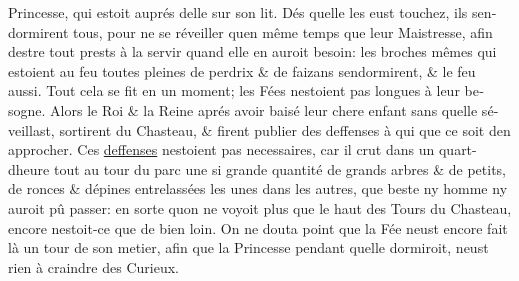 \documentclass[14pt,a4paper]{memoir}
\newcommand{\ul}[1]{\uline{#1}}
\begin{document}
\begin{otherlanguage}{french}
Princesse, qui estoit auprés d\textquotesingle elle sur son lit. Dés
qu\textquotesingle elle les eust touchez, ils
s\textquotesingle endormirent tous, pour ne se réveiller
qu\textquotesingle en même temps que leur Maistresse, afin
d\textquotesingle estre tout prests à la servir quand elle en auroit
besoin: les broches mêmes qui estoient au feu toutes pleines de perdrix
\& de faizans s\textquotesingle endormirent, \& le feu aussi. Tout cela
se fit en un moment; les Fées n\textquotesingle estoient pas longues à
leur besogne. Alors le Roi \& la Reine aprés avoir baisé leur chere
enfant sans qu\textquotesingle elle s\textquotesingle éveillast,
sortirent du Chasteau, \& firent publier des deffenses à qui que ce soit
d\textquotesingle en approcher. Ces \ul{deffenses}
n\textquotesingle estoient pas necessaires, car il crut dans un
quart-d\textquotesingle heure tout au tour du parc une si grande
quantité de grands arbres \& de petits, de ronces \&
d\textquotesingle épines entrelassées les unes dans les autres, que
beste ny homme n\textquotesingle y auroit pû passer: en sorte
qu\textquotesingle on ne voyoit plus que le haut des Tours du Chasteau,
encore n\textquotesingle estoit-ce que de bien loin. On ne douta point
que la Fée n\textquotesingle eust encore fait là un tour de son metier,
afin que la Princesse pendant qu\textquotesingle elle dormiroit,
n\textquotesingle eust rien à craindre des Curieux.


\end{otherlanguage}
\end{document}
